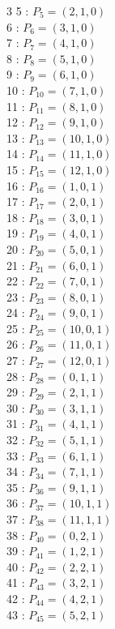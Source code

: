 \documentclass{article}
\begin{document}
{\begin{multicols}{3}
5 : $P_{5}=( 2, 1, 0 )$\\
6 : $P_{6}=( 3, 1, 0 )$\\
7 : $P_{7}=( 4, 1, 0 )$\\
8 : $P_{8}=( 5, 1, 0 )$\\
9 : $P_{9}=( 6, 1, 0 )$\\
10 : $P_{10}=( 7, 1, 0 )$\\
11 : $P_{11}=( 8, 1, 0 )$\\
12 : $P_{12}=( 9, 1, 0 )$\\
13 : $P_{13}=( 10, 1, 0 )$\\
14 : $P_{14}=( 11, 1, 0 )$\\
15 : $P_{15}=( 12, 1, 0 )$\\
16 : $P_{16}=( 1, 0, 1 )$\\
17 : $P_{17}=( 2, 0, 1 )$\\
18 : $P_{18}=( 3, 0, 1 )$\\
19 : $P_{19}=( 4, 0, 1 )$\\
20 : $P_{20}=( 5, 0, 1 )$\\
21 : $P_{21}=( 6, 0, 1 )$\\
22 : $P_{22}=( 7, 0, 1 )$\\
23 : $P_{23}=( 8, 0, 1 )$\\
24 : $P_{24}=( 9, 0, 1 )$\\
25 : $P_{25}=( 10, 0, 1 )$\\
26 : $P_{26}=( 11, 0, 1 )$\\
27 : $P_{27}=( 12, 0, 1 )$\\
28 : $P_{28}=( 0, 1, 1 )$\\
29 : $P_{29}=( 2, 1, 1 )$\\
30 : $P_{30}=( 3, 1, 1 )$\\
31 : $P_{31}=( 4, 1, 1 )$\\
32 : $P_{32}=( 5, 1, 1 )$\\
33 : $P_{33}=( 6, 1, 1 )$\\
34 : $P_{34}=( 7, 1, 1 )$\\
35 : $P_{36}=( 9, 1, 1 )$\\
36 : $P_{37}=( 10, 1, 1 )$\\
37 : $P_{38}=( 11, 1, 1 )$\\
38 : $P_{40}=( 0, 2, 1 )$\\
39 : $P_{41}=( 1, 2, 1 )$\\
40 : $P_{42}=( 2, 2, 1 )$\\
41 : $P_{43}=( 3, 2, 1 )$\\
42 : $P_{44}=( 4, 2, 1 )$\\
43 : $P_{45}=( 5, 2, 1 )$\\

\end{multicols}}
\end{document}
